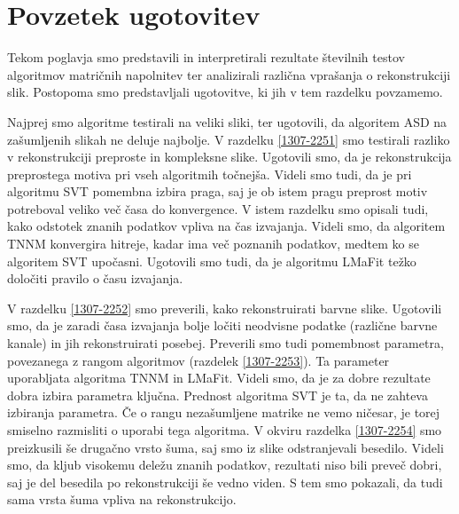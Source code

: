\section{Povzetek ugotovitev} 
\label{2107-1444}
Tekom poglavja smo predstavili in interpretirali rezultate številnih testov algoritmov matričnih napolnitev ter analizirali različna vprašanja o rekonstrukciji slik. Postopoma smo predstavljali ugotovitve, ki jih v tem razdelku povzamemo.

Najprej smo algoritme testirali na veliki sliki, ter ugotovili, da algoritem ASD na zašumljenih slikah ne deluje najbolje.  V razdelku \ref{1307-2251} smo testirali razliko v rekonstrukciji preproste in kompleksne slike. Ugotovili smo, da je rekonstrukcija preprostega motiva pri vseh algoritmih točnejša. Videli smo tudi, da je pri algoritmu SVT pomembna izbira praga, saj je ob istem pragu preprost motiv potreboval veliko več časa do konvergence. V istem razdelku smo opisali tudi, kako odstotek znanih podatkov vpliva na čas izvajanja. Videli smo, da algoritem TNNM konvergira hitreje, kadar ima več poznanih podatkov, medtem ko se algoritem SVT upočasni. Ugotovili smo tudi, da je algoritmu LMaFit težko določiti pravilo o času izvajanja. 

V razdelku \ref{1307-2252} smo preverili, kako rekonstruirati barvne slike. Ugotovili smo, da je zaradi časa izvajanja bolje ločiti neodvisne podatke (različne barvne kanale) in jih rekonstruirati posebej. Preverili smo tudi pomembnost parametra, povezanega z rangom algoritmov (razdelek \ref{1307-2253}). Ta parameter uporabljata algoritma TNNM in LMaFit. Videli smo, da je za dobre rezultate dobra izbira parametra ključna. Prednost algoritma SVT je ta, da ne zahteva izbiranja parametra. Če o rangu nezašumljene matrike ne vemo ničesar, je torej smiselno razmisliti o uporabi tega algoritma. V okviru razdelka \ref{1307-2254} smo preizkusili še drugačno vrsto šuma, saj smo iz slike odstranjevali besedilo. Videli smo, da kljub visokemu deležu znanih podatkov, rezultati niso bili preveč dobri, saj je del besedila po rekonstrukciji še vedno viden. S tem smo pokazali, da tudi sama vrsta šuma vpliva na rekonstrukcijo.

